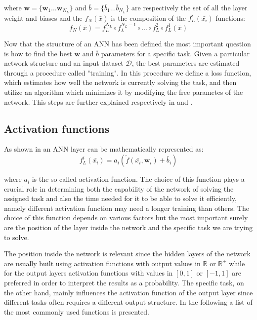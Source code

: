 where $\boldsymbol{w} = \{\boldsymbol{w}_1 \dots \boldsymbol{w}_{N_L}\}$ and 
$ \bar{b} = \{ \bar{b}_1 \dots  \bar{b}_{N_L}\}$ are respectively the set of all the layer weight and biases and the $f_N(\bar{x})$ is the composition of the $f_L^i(\bar{x_i})$
functions:
\begin{equation}
    f_N(\bar{x}) = f_L^{N_L} \circ f_L^{N_L-1}\circ\dots\circ f_L^2\circ f_L^1 (\bar{x}) 
\end{equation}

Now that the structure of an ANN has been defined the most important question is how to find the best $\boldsymbol{w}$ and $\bar{b}$ parameters for a specific task.
Given a particular network structure and an input dataset $\mathcal{D}$, the best parameters  are estimated through a procedure called "training". In this procedure we define a loss function, which estimates how well the network is currently solving the task, and then utilize an algorithm which minimizes it by modifying the free parametes of the network. This steps are further explained respectively in 
and .

\subsection{Activation functions}\label{activations}

As shown in  an ANN layer can be mathematically represented as:
\begin{equation}
    f_L^i (\bar{x_i})=a_i \left( \tilde{f}(\bar{x_i}, \boldsymbol{w}_i) + \bar{b}_i \right) 
    \label{eq:layer_math}
\end{equation}

where $a_i$ is the so-called activation function. The choice of this function plays a crucial role in determining both the capability of the network of solving the assigned task and also  the time needed for it to be able to solve it efficiently, namely different activation function may need a longer training than others. The choice of this function depends on various factors but the most important surely are the position of the layer inside the network and the specific task we are trying to solve.

The position inside the network is relevant since the hidden layers of the network are usually built using activation functions with output values in $\mathbb{R}$ or $\mathbb{R}^+$ while for the output layers activation functions with values in $[0,1]$ or $[-1,1]$ are preferred in order to interpret the results as a probability.
The specific task, on the other hand, mainly influences the activation function of the output layer since different tasks often requires a different output structure.
In the following a list of the most commonly used functions is presented.

